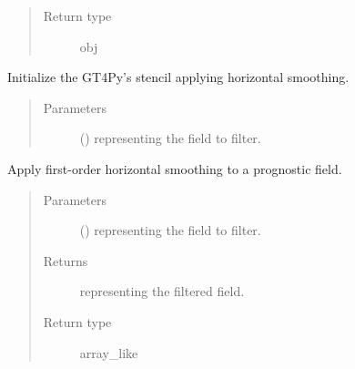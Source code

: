\documentclass[letterpaper,10pt,english]{sphinxmanual}
\begin{document}
\begin{fulllineitems}
\begin{fulllineitems}
\begin{quote}
\begin{description}
\item[{Return type}] \leavevmode
obj

\end{description}\end{quote}

\end{fulllineitems}


\begin{fulllineitems}
\label{\detokenize{api:dycore.horizontal_smoothing.HorizontalSmoothingFirstOrderXZ._stencil_initialize}}
Initialize the GT4Py’s stencil applying horizontal smoothing.
\begin{quote}\begin{description}
\item[{Parameters}] \leavevmode
{} () \textendash{}  representing the field to filter.

\end{description}\end{quote}

\end{fulllineitems}


\begin{fulllineitems}
\label{\detokenize{api:dycore.horizontal_smoothing.HorizontalSmoothingFirstOrderXZ.apply}}
Apply first-order horizontal smoothing to a prognostic field.
\begin{quote}\begin{description}
\item[{Parameters}] \leavevmode
{} () \textendash{}  representing the field to filter.

\item[{Returns}] \leavevmode
{} representing the filtered field.

\item[{Return type}] \leavevmode
array\_like

\end{description}\end{quote}

\end{fulllineitems}


\end{fulllineitems}
\end{document}
